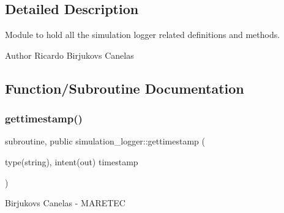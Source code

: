 \subsection{Detailed Description}
Module to hold all the simulation logger related definitions and methods. 

\begin{DoxyAuthor}{Author}
Ricardo Birjukovs Canelas 
\end{DoxyAuthor}


\subsection{Function/\+Subroutine Documentation}
\mbox{\label{namespacesimulation__logger_a13446c36aac51547a72b39003f735257}} 
\subsubsection{\texorpdfstring{gettimestamp()}{gettimestamp()}}
{\footnotesize\ttfamily subroutine, public simulation\+\_\+logger\+::gettimestamp (\begin{DoxyParamCaption}\item[{type(string), intent(out)}]{timestamp }\end{DoxyParamCaption})}



Birjukovs Canelas -\/ M\+A\+R\+E\+T\+EC 

